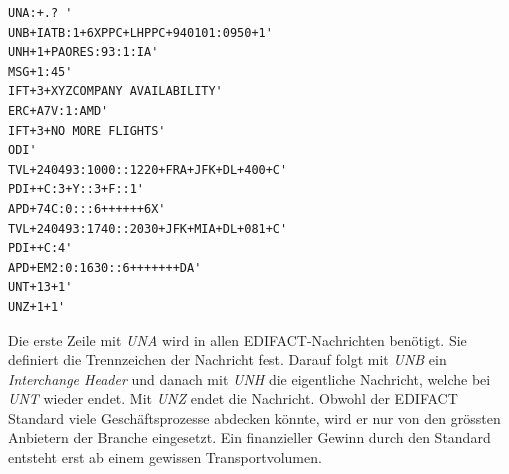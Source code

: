 \begin{verbatim}
UNA:+.? '
UNB+IATB:1+6XPPC+LHPPC+940101:0950+1'
UNH+1+PAORES:93:1:IA'
MSG+1:45'
IFT+3+XYZCOMPANY AVAILABILITY'
ERC+A7V:1:AMD'
IFT+3+NO MORE FLIGHTS'
ODI'
TVL+240493:1000::1220+FRA+JFK+DL+400+C'
PDI++C:3+Y::3+F::1'
APD+74C:0:::6++++++6X'
TVL+240493:1740::2030+JFK+MIA+DL+081+C'
PDI++C:4'
APD+EM2:0:1630::6+++++++DA'
UNT+13+1'
UNZ+1+1'
\end{verbatim}
Die erste Zeile mit \textit{UNA} wird in allen EDIFACT-Nachrichten benötigt. Sie definiert die Trennzeichen der Nachricht fest. Darauf folgt mit \textit{UNB} ein \textit{Interchange Header} und danach mit \textit{UNH} die eigentliche Nachricht, welche bei \textit{UNT} wieder endet. Mit \textit{UNZ} endet die Nachricht.
\newline{}
Obwohl der EDIFACT Standard viele Geschäftsprozesse abdecken könnte, wird er nur von den grössten Anbietern der Branche eingesetzt. Ein finanzieller Gewinn durch den Standard entsteht erst ab einem gewissen Transportvolumen.

